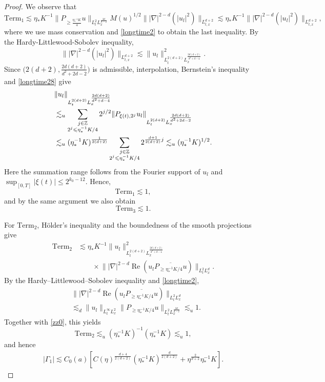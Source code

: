 \documentclass[reqno,11pt]{amsart}
\theoremstyle{plain}
\theoremstyle{definition}
\numberwithin{equation}{section}
\numberwithin{theorem}{section}
\def\geq{\geqslant}
\def\leq{\leqslant}
\begin{document}
\begin{proof}
We observe that
\[
\mathrm{Term}_{1}\lesssim \eta_{\ast}K^{-1}\| P_{\geq \frac{\eta_{\ast}^{-1}K}{4}}u\|_{L_{t}^{2}L_{x}^{\frac{2d}{d-2}}}M(u)^{1/2}\| |\nabla |^{2-d}(|u_{l}|^{2})\|_{L_{t,x}^{d+2}}
\lesssim \eta_{\ast}K^{-1}\| |\nabla |^{2-d}(|u_{l}|^{2})\|_{L_{t,x}^{d+2}},
\]
where we use mass conservation and \eqref{longtime2} to obtain the last inequality. By the Hardy-Littlewood-Sobolev inequality,
\[
\| |\nabla |^{2-d}(|u_{l}|^{2})\|_{L_{t,x}^{d+2}}\lesssim \| u_{l}\|_{L_{t}^{2(d+2)}L_{x}^{\frac{2d(d+2)}{d^2+d-4}}}^{2}. 
\]
Since $\big(2(d+2),\frac{2d(d+2)}{d^2+2d-2}\big)$ is admissible,
interpolation, Bernstein's inequality and \eqref{longtime28} give
\begin{align}
 &\|u_l\|_{L_t^{2(d+2)}L_x^{\frac{2d(d+2)}{d^2+d-4}}}\notag\\
 &\lesssim_u\sum_{\substack{j\in\mathbb Z\\2^j\leq\eta_{\ast}^{-1}K/4}}
       2^{j/2}\|P_{\xi(t),2^j}u_l\|_
                   {L_t^{2(d+2)}L_x^{\frac{2d(d+2)}{d^2+2d-2}}}\notag\\
 &\lesssim_u(\eta_{\ast}^{-1}K)^{\frac1{2(d+2)}}
       \sum_{\substack{j\in\mathbb Z\\2^j\leq\eta_{\ast}^{-1}K/4}}
                  2^{\frac{d+1}{2(d+2)}j}
 \lesssim_u(\eta_{\ast}^{-1}K)^{1/2}.\label{zz0}
\end{align}
Here the summation range follows from the Fourier support of $u_l$ and
$\sup_{[0,T]}|\xi(t)|\leq2^{k_0-12}$.
Hence,
\[
\mathrm{Term}_{1}\lesssim 1,
\]
and by the same argument we also obtain
\[
\mathrm{Term}_{3}\lesssim 1. 
\]

For $\mathrm{Term}_2$, H\"older's inequality and the boundedness of the
smooth projections give
\begin{align*}
 \mathrm{Term}_2
 &\lesssim\eta_{\ast}K^{-1}
 \|u_l\|_{L_t^{2(d+2)}L_x^{\frac{2d(d+2)}{d^2+d-4}}}^{2}\\
 &\qquad\times
 \big\||\nabla|^{2-d}\operatorname{Re}
       (u_l\overline{P_{\geq\eta_{\ast}^{-1}K/4}u})\big\|_{L_t^2L_x^d}.
\end{align*}
By the Hardy--Littlewood--Sobolev inequality and \eqref{longtime2},
\begin{align*}
 &\big\||\nabla|^{2-d}\operatorname{Re}
       (u_l\overline{P_{\geq\eta_{\ast}^{-1}K/4}u})\big\|_{L_t^2L_x^d}\\
 &\lesssim_d\|u_l\|_{L_t^\infty L_x^2}
       \|P_{\geq\eta_{\ast}^{-1}K/4}u\|_
                         {L_t^2L_x^{\frac{2d}{d-2}}}
 \lesssim_u1.
\end{align*}
Together with \eqref{zz0}, this yields
\[
 \mathrm{Term}_2\lesssim_u
 (\eta_{\ast}^{-1}K)^{-1}(\eta_{\ast}^{-1}K)\lesssim_u1,
\]
and hence
\begin{align*}
    \left|\Gamma_1\right|\lesssim C_0(a)[C(\eta)^{\frac{d+4}{2(d+2)}}(\eta_{\ast}^{-1}K)^{\frac{d}{2(d+2)}}+\eta^{\frac{2}{d+2}} \eta_{\ast}^{-1}K].
\end{align*}


\end{proof}
\end{document}
